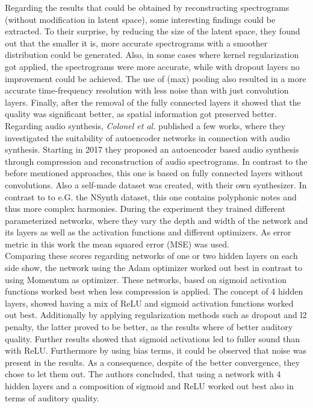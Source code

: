 Regarding the results that could be obtained by reconstructing spectrograms (without modification in latent space), some interesting findings could be extracted. To their surprise, by reducing the size of the latent space, they found out that the smaller it is, more accurate spectrograms with a smoother distribution could be generated. Also, in some cases where kernel regularization got applied, the spectrograms were more accurate, while with dropout layers no improvement could be achieved. The use of (max) pooling also resulted in a more accurate time-frequency resolution with less noise than with just convolution layers. Finally, after the removal of the fully connected  layers it showed that the quality was significant better, as spatial information got preserved better.\\

Regarding audio synthesis, \textit{Colonel et al.} published a few works, where they investigated the suitability of autoencoder networks in connection with audio synthesis. \cite{colonel2017improving, colonel2018autoencoding, Colonel2020} Starting in 2017 they proposed an autoencoder based audio synthesis through compression and reconstruction of audio spectrograms. \cite{colonel2017improving} In contrast to the before mentioned approaches, this one is based on fully connected layers without convolutions. Also a self-made dataset was created, with their own synthesizer. In contrast to to e.G. the NSynth dataset, this one contains polyphonic notes and thus more complex harmonies. During the experiment they trained different parameterized networks, where they vary the depth and width of the network and its layers as well as the activation functions and different optimizers. As error metric in this work the mean squared error (MSE) was used.\\
Comparing these scores regarding networks of one or two hidden layers on each side show, the network using the Adam optimizer worked out best in contrast to using Momentum as optimizer. These networks, based on sigmoid activation functions worked best when less compression is applied. The concept of 4 hidden layers, showed having a mix of ReLU and sigmoid activation functions worked out best. Additionally by applying regularization methods such as dropout and l2 penalty, the latter proved to be better, as the results where of better auditory quality. Further results showed that sigmoid activations led to fuller sound than with ReLU. Furthermore by using bias terms, it could be observed that noise was present in the results. As a consequence, despite of the better convergence, they chose to let them out. The authors concluded, that using a network with 4 hidden layers and a composition of sigmoid and ReLU worked out best also in terms of auditory quality.\\


